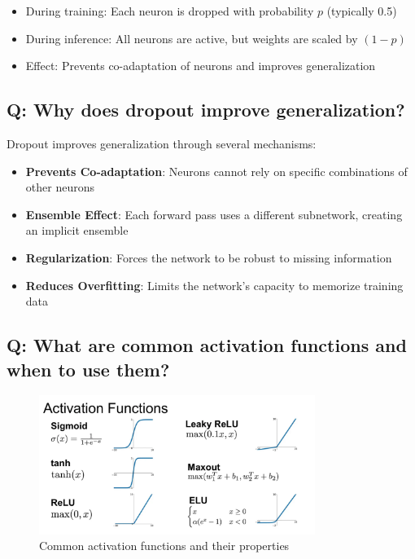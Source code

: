 \begin{itemize}
	\item During training: Each neuron is dropped with probability $p$ (typically 0.5)
	\item During inference: All neurons are active, but weights are scaled by $(1-p)$
	\item Effect: Prevents co-adaptation of neurons and improves generalization
\end{itemize}

\subsection*{\textcolor{primaryteal}{Q: Why does dropout improve generalization?}}
Dropout improves generalization through several mechanisms:

\begin{itemize}
	\item \textbf{Prevents Co-adaptation}: Neurons cannot rely on specific combinations of other neurons
	\item \textbf{Ensemble Effect}: Each forward pass uses a different subnetwork, creating an implicit ensemble
	\item \textbf{Regularization}: Forces the network to be robust to missing information
	\item \textbf{Reduces Overfitting}: Limits the network's capacity to memorize training data
\end{itemize}

\subsection*{\textcolor{primaryteal}{Q: What are common activation functions and when to use them?}}
\begin{figure}[H]
	\centering
	\includegraphics[width=0.8\textwidth]{activation.png}
	\caption{Common activation functions and their properties}
\end{figure}

